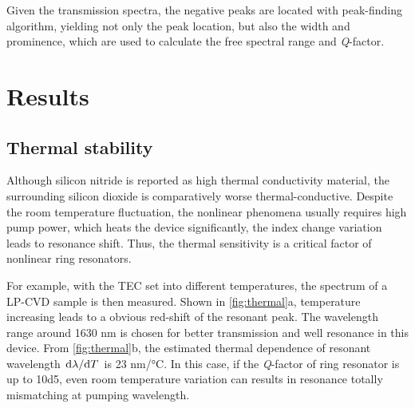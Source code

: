 Given the transmission spectra, the negative peaks are located with peak-finding algorithm, yielding not only the peak location, but also the width and prominence, which are used to calculate the free spectral range and \textit{Q}-factor.

\section{Results}

\subsection{Thermal stability}

\begin{figure}
	\centering
	
	\mycaption{}{}
	\label{fig:thermal}
\end{figure}

%	

Although silicon nitride is reported as high thermal conductivity material, the surrounding silicon dioxide is comparatively worse thermal-conductive. Despite the room temperature fluctuation, the nonlinear phenomena usually requires high pump power, which heats the device significantly, the index change variation leads to resonance shift. Thus, the thermal sensitivity is a critical factor of nonlinear ring resonators.

For example, with the TEC set into different temperatures, the spectrum of a LP-CVD sample is then measured. Shown in \autoref{fig:thermal}a, temperature increasing leads to a obvious red-shift of the resonant peak. The wavelength range around 1630 nm is chosen for better transmission and well resonance in this device. From \autoref{fig:thermal}b, the estimated thermal dependence of resonant wavelength $\dv*{\lambda}{T}$ is 23 \si{\nm/\celsius}. In this case, if the \textit{Q}-factor of ring resonator is up to \num{10d5}, even room temperature variation can results in resonance totally mismatching at pumping wavelength.


